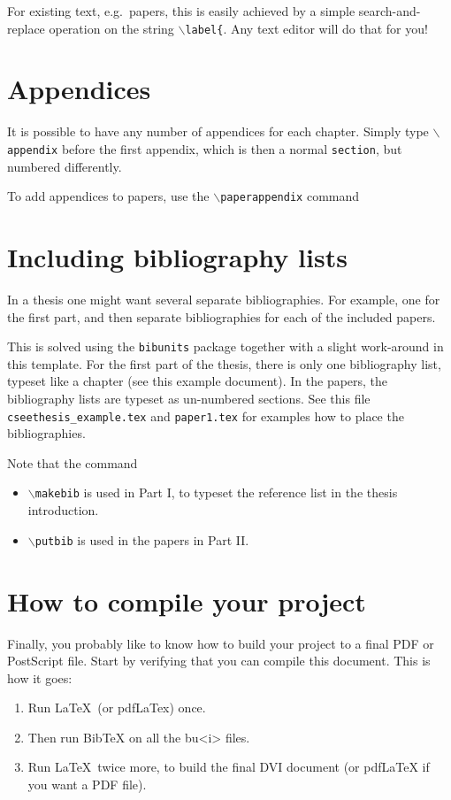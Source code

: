 For existing text, e.g.\ papers, this is easily achieved by a simple search-and-replace operation on the string \texttt{$\backslash$label\{}. Any text editor will do that for you!

\section{Appendices\label{sec:app}}
It is possible to have any number of appendices for each chapter.
Simply type \texttt{$\backslash$appendix} before the first appendix,
which is then a normal \texttt{section}, but numbered differently.

To add appendices to papers, use the
\texttt{$\backslash$paperappendix} command

\section{Including bibliography lists\label{sec:bib}}
In a thesis one might want several separate bibliographies. For
example, one for the first part, and then separate bibliographies
for each of the included papers.

This is solved using the \texttt{bibunits} package together with a
slight work-around in this template. For the first part of the
thesis, there is only one bibliography list, typeset like a chapter
(see this example document). In the papers, the bibliography lists
are typeset as un-numbered sections. See this file
\texttt{cseethesis\_example.tex} and \texttt{paper1.tex} for examples
how to place the bibliographies. 

Note that the command
\begin{itemize}
	\item \texttt{$\backslash$makebib} is used in Part I, to typeset the reference list in the thesis introduction.
	\item \texttt{$\backslash$putbib} is used in the papers in Part II.
\end{itemize}

\section{How to compile your project}
Finally, you probably like to know how to build your project to a
final PDF or PostScript file. Start by verifying that you can
compile this document. This is how it goes:
%
\begin{enumerate}
    \item Run \LaTeX\ (or pdfLaTex) once.
    \item Then run BibTeX on all the
    bu<i> files.
    \item Run \LaTeX\ twice more, to build the final DVI document
    (or pdfLaTeX if you want a PDF file).
\end{enumerate}

